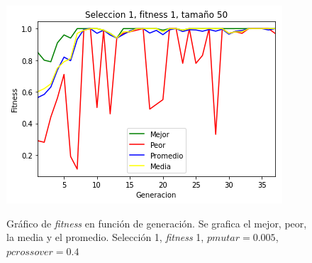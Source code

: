 \documentclass[A4paper,oneside,fleqn,11pt]{article}
\theoremstyle{definition}
\begin{document}
\begin{figure}[H]
	\captionsetup[subfigure]{position=b}
	\centering
		{\includegraphics[width=0.3\linewidth]{s1f1t50.png}}
	\caption{Gráfico de \textit{fitness} en función de generación. Se grafica el mejor, peor, la media y el promedio. Selección 1, \textit{fitness} 1, $pmutar=0.005$, $pcrossover=0.4$}
\end{figure}
\end{document}
